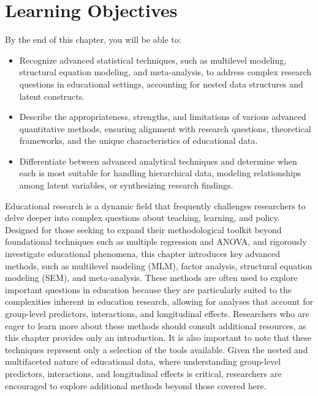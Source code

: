 \documentclass[
  letterpaper,
  DIV=11,
  numbers=noendperiod]{scrreprt}
\begin{document}

\section*{Learning Objectives}\label{learning-objectives-13}


By the end of this chapter, you will be able to:

\begin{itemize}
\item
  Recognize advanced statistical techniques, such as multilevel
  modeling, structural equation modeling, and meta-analysis, to address
  complex research questions in educational settings, accounting for
  nested data structures and latent constructs.
\item
  Describe the appropriateness, strengths, and limitations of various
  advanced quantitative methods, ensuring alignment with research
  questions, theoretical frameworks, and the unique characteristics of
  educational data.
\item
  Differentiate between advanced analytical techniques and determine
  when each is most suitable for handling hierarchical data, modeling
  relationships among latent variables, or synthesizing research
  findings.
\end{itemize}

Educational research is a dynamic field that frequently challenges
researchers to delve deeper into complex questions about teaching,
learning, and policy. Designed for those seeking to expand their
methodological toolkit beyond foundational techniques such as multiple
regression and ANOVA, and rigorously investigate educational phenomena,
this chapter introduces key advanced methods, such as multilevel
modeling (MLM), factor analysis, structural equation modeling (SEM), and
meta-analysis. These methods are often used to explore important
questions in education because they are particularly suited to the
complexities inherent in education research, allowing for analyses that
account for group-level predictors, interactions, and longitudinal
effects. Researchers who are eager to learn more about these methods
should consult additional resources, as this chapter provides only an
introduction. It is also important to note that these techniques
represent only a selection of the tools available. Given the nested and
multifaceted nature of educational data, where understanding group-level
predictors, interactions, and longitudinal effects is critical,
researchers are encouraged to explore additional methods beyond those
covered here.
\end{document}
